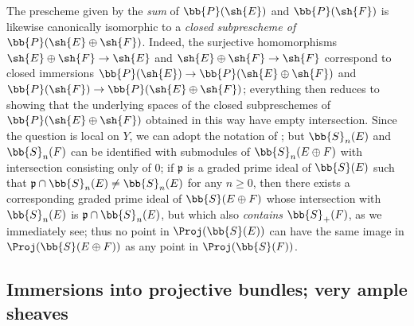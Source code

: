 \begin{remark}[4.3.6]
\label{II.4.3.6}
The prescheme given by the \emph{sum} of $\bb{P}(\sh{E})$ and $\bb{P}(\sh{F})$ is likewise canonically isomorphic to a \emph{closed subprescheme of $\bb{P}(\sh{E}\oplus\sh{F})$}.
Indeed, the surjective homomorphisms $\sh{E}\oplus\sh{F}\to\sh{E}$ and $\sh{E}\oplus\sh{F}\to\sh{F}$ correspond to closed immersions $\bb{P}(\sh{E})\to\bb{P}(\sh{E}\oplus\sh{F})$ and $\bb{P}(\sh{F})\to\bb{P}(\sh{E}\oplus\sh{F})$;
everything then reduces to showing that the underlying spaces of the closed subpreschemes of $\bb{P}(\sh{E}\oplus\sh{F})$ obtained in this way have empty intersection.
Since the question is local on $Y$, we can adopt the notation of ;
but $\bb{S}_n(E)$ and $\bb{S}_n(F)$ can be identified with submodules of $\bb{S}_n(E\oplus F)$ with intersection consisting only of $0$;
if $\mathfrak{p}$ is a graded prime ideal of $\bb{S}(E)$ such that $\mathfrak{p}\cap\bb{S}_n(E)\neq\bb{S}_n(E)$ for any $n\geq0$, then there exists a corresponding graded prime ideal of $\bb{S}(E\oplus F)$ whose intersection with $\bb{S}_n(E)$ is $\mathfrak{p}\cap\bb{S}_n(E)$, but which also \emph{contains} $\bb{S}_+(F)$, as we immediately see;
thus no point in $\Proj(\bb{S}(E))$ can have the same image in $\Proj(\bb{S}(E\oplus F))$ as any point in $\Proj(\bb{S}(F))$.
\end{remark}


\subsection{Immersions into projective bundles; very ample sheaves}
\label{subsection:II.4.4}

